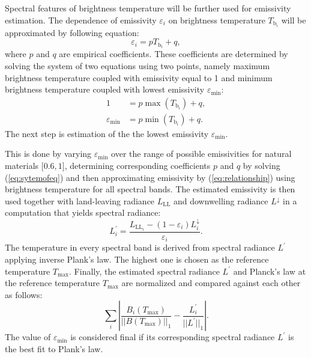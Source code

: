 Spectral features of brightness temperature will be further used for emissivity estimation. The dependence of emissivity $ {\varepsilon_i}$ on brightness temperature $ {T_{\mathrm{b}_i}}$ will be approximated by following equation:
\begin{equation} \varepsilon_{ {i}} =  {p} T_{\mathrm{b}_{ {i}}} +  {q}, \label{eq:relationship}\end{equation}
where $ {p}$ and $ {q}$ are empirical coefficients. These coefficients are determined by solving the system of two equations using two points, namely maximum brightness temperature coupled with emissivity equal to 1 and minimum brightness temperature coupled with lowest emissivity $\varepsilon_\mathrm{min}$:
\begin{equation}
\begin{aligned}
	1 &=  {p} \max (T_{\mathrm{b}_{ {i}}}) +  {q}, \\
	\varepsilon_\mathrm{min} &=  {p} \min (T_{\mathrm{b}_{ {i}}}) +  {q}.
\end{aligned}
\label{eq:sytemofeq}
\end{equation}
The next step is estimation of the the lowest emissivity $\varepsilon_\mathrm{min}$.

This is done by varying $\varepsilon_\mathrm{min}$ over the range  {of possible emissivities for natural materials $[0.6,1{ {]}}$}, determining corresponding coefficients $ {p}$ and $ {q}$ by solving (\ref{eq:sytemofeq}) and then approximating emissivity by (\ref{eq:relationship}) using brightness temperature for all spectral bands. The estimated emissivity is then used together with land-leaving radiance $L_\mathrm{LL}$ and downwelling radiance $L^\downarrow$ in a computation that yields spectral radiance:
\begin{equation}
	L^{\prime}_{ {i}} = \frac{L_{\mathrm{LL}_{ {i}}}-(1-\varepsilon_{ {i}})L^\downarrow_{ {i}}}{\varepsilon_{ {i}}}.
	\label{eq:lprime}
\end{equation}
The temperature in every spectral band is derived from spectral radiance $L^{\prime}$ applying inverse Plank's law. The highest one is chosen as the reference temperature $T_\mathrm{max}$. Finally, the estimated spectral radiance $L^{\prime}$ and Planck's law at the reference temperature $T_\mathrm{max}$ are normalized and compared against each other as follows:
\begin{equation*}
	\sum_{ {i}} \left| \frac{B_{ {i}}(T_\mathrm{max})}{||B(T_\mathrm{max})||_1} - \frac{L^\prime_{ {i}}}{||L^\prime||_1} \right|.
\end{equation*}
The value of $\varepsilon_\mathrm{min}$ is considered final if its corresponding spectral radiance $L^{\prime}$  {is the best fit to Plank's law}.

